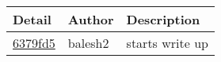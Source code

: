 \begin{tabular}{l l l}\textbf{Detail} & \textbf{Author} & \textbf{Description}\\\hline
\href{https://github.com/balesh2/CS444-3/commit/6379fd575b665ad1a2ee5b224fd9f2011d5eaa09}{6379fd5} & balesh2 & starts write up\\\hline\end{tabular}
